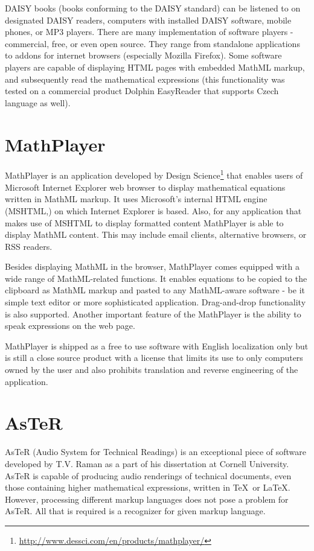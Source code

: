 \documentclass[11pt,oneside,final]{fithesis2}
\begin{document}
DAISY books (books conforming to the DAISY standard) can be listened to on designated DAISY readers, computers with installed DAISY software, mobile phones, or MP3 players. There are many implementation of software players - commercial, free, or even open source. They range from standalone applications to addons for internet browsers (especially Mozilla Firefox). Some software players are capable of displaying HTML pages with embedded MathML markup, and subsequently read the mathematical expressions (this functionality was tested on a commercial product Dolphin EasyReader that supports Czech language as well).   

\section{MathPlayer}
\label{mathml:mathplayer}
MathPlayer is an application developed by Design Science\footnote{\url{http://www.dessci.com/en/products/mathplayer/}} that enables users of Microsoft Internet Explorer web browser to display mathematical equations written in MathML markup. It uses Microsoft's internal HTML engine (MSHTML,) on which Internet Explorer is based. Also, for any application that makes use of MSHTML to display formatted content MathPlayer is able to display MathML content. This may include email clients, alternative browsers, or RSS readers. 

Besides displaying MathML in the browser, MathPlayer comes equipped with a wide range of MathML-related functions. It enables equations to be copied to the clipboard as MathML markup and pasted to any MathML-aware software - be it simple text editor or more sophisticated application. Drag-and-drop functionality is also supported. Another important feature of the MathPlayer is the ability to speak expressions on the web page.

MathPlayer is shipped as a free to use software with English localization only but is still a close source product with a license that limits its use to only computers owned by the user and also prohibits translation and reverse engineering of the application.

\section{AsTeR}
AsTeR (Audio System for Technical Readings) \cite{aster1994} is an exceptional piece of software developed by T.V. Raman as a part of his dissertation at Cornell University. AsTeR is capable of producing audio renderings of technical documents, even those containing higher mathematical expressions, written in \TeX\ or \LaTeX. However, processing different markup languages does not pose a problem for AsTeR. All that is required is a recognizer for given markup language. 
\end{document}
